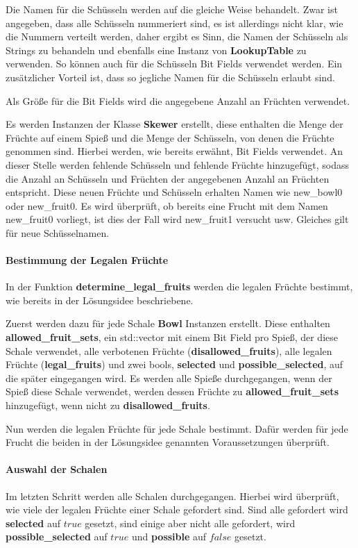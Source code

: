 \documentclass[a4paper,10pt,ngerman]{scrartcl}
\begin{document}
Die Namen für die Schüsseln werden auf die gleiche Weise behandelt.
Zwar ist angegeben, dass alle Schüsseln nummeriert sind, es ist allerdings nicht klar, wie die Nummern verteilt werden, daher ergibt es Sinn, die Namen der Schüsseln als Strings zu behandeln und ebenfalls eine Instanz von \textbf{LookupTable} zu verwenden.
So können auch für die Schüsseln Bit Fields verwendet werden.
Ein zusätzlicher Vorteil ist, dass so jegliche Namen für die Schüsseln erlaubt sind.

Als Größe für die Bit Fields wird die angegebene Anzahl an Früchten verwendet.

Es werden Instanzen der Klasse \textbf{Skewer} erstellt, diese enthalten die Menge der Früchte auf einem Spieß und die Menge der Schüsseln, von denen die Früchte genommen sind.
Hierbei werden, wie bereits erwähnt, Bit Fields verwendet.
An dieser Stelle werden fehlende Schüsseln und fehlende Früchte hinzugefügt, sodass die Anzahl an Schüsseln und Früchten der angegebenen Anzahl an Früchten entspricht.
Diese neuen Früchte und Schüsseln erhalten Namen wie \glqq new\_bowl0\grqq{} oder \glqq new\_fruit0\grqq{}.
Es wird überprüft, ob bereits eine Frucht mit dem Namen \glqq new\_fruit0\grqq{} vorliegt, ist dies der Fall wird \glqq new\_fruit1\grqq{} versucht usw.
Gleiches gilt für neue Schüsselnamen.

\paragraph{Bestimmung der Legalen Früchte}
In der Funktion \textbf{determine\_legal\_fruits} werden die legalen Früchte bestimmt, wie bereits in der Lösungsidee beschriebene.

Zuerst werden dazu für jede Schale \textbf{Bowl} Instanzen erstellt.
Diese enthalten \textbf{allowed\_fruit\_sets}, ein std::vector mit einem Bit Field pro Spieß, der diese Schale verwendet, alle verbotenen Früchte (\textbf{disallowed\_fruits}), alle legalen Früchte (\textbf{legal\_fruits}) und zwei bools, \textbf{selected} und \textbf{possible\_selected}, auf die später eingegangen wird.
Es werden alle Spieße durchgegangen, wenn der Spieß diese Schale verwendet, werden dessen Früchte zu \textbf{allowed\_fruit\_sets} hinzugefügt, wenn nicht zu \textbf{disallowed\_fruits}.

Nun werden die legalen Früchte für jede Schale bestimmt.
Dafür werden für jede Frucht die beiden in der Lösungsidee genannten Voraussetzungen überprüft.

\paragraph{Auswahl der Schalen}
Im letzten Schritt werden alle Schalen durchgegangen.
Hierbei wird überprüft, wie viele der legalen Früchte einer Schale gefordert sind.
Sind alle gefordert wird \textbf{selected} auf $true$ gesetzt, sind einige aber nicht alle gefordert, wird \textbf{possible\_selected} auf $true$ und \textbf{possible} auf $false$ gesetzt.
\end{document}
